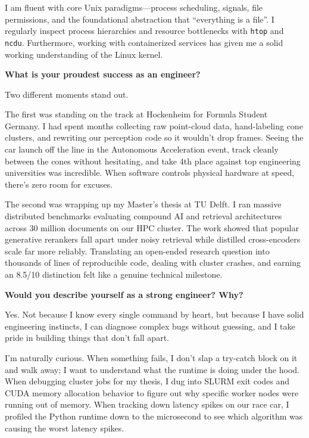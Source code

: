 \documentclass[letterpaper,11pt]{article}
\newcommand{\interviewQuestion}[1]{%
  \vspace{8pt}%
  \textbf{\color{airforceblue}#1}\par%
}
\begin{document}
I am fluent with core Unix paradigms—process scheduling, signals, file permissions, and the foundational abstraction that ``everything is a file''. I regularly inspect process hierarchies and resource bottlenecks with \texttt{htop} and \texttt{ncdu}. Furthermore, working with containerized services has given me a solid working understanding of the Linux kernel.

\interviewQuestion{What is your proudest success as an engineer?}

Two different moments stand out.

The first was standing on the track at Hockenheim for Formula Student Germany. I had spent months collecting raw point-cloud data, hand-labeling cone clusters, and rewriting our perception code so it wouldn't drop frames. Seeing the car launch off the line in the Autonomous Acceleration event, track cleanly between the cones without hesitating, and take 4th place against top engineering universities was incredible. When software controls physical hardware at speed, there's zero room for excuses.

The second was wrapping up my Master's thesis at TU Delft. I ran massive distributed benchmarks evaluating compound AI and retrieval architectures across 30 million documents on our HPC cluster. The work showed that popular generative rerankers fall apart under noisy retrieval while distilled cross-encoders scale far more reliably. Translating an open-ended research question into thousands of lines of reproducible code, dealing with cluster crashes, and earning an 8.5/10 distinction felt like a genuine technical milestone.

\interviewQuestion{Would you describe yourself as a strong engineer? Why?}

Yes. Not because I know every single command by heart, but because I have solid engineering instincts, I can diagnose complex bugs without guessing, and I take pride in building things that don't fall apart.

I'm naturally curious. When something fails, I don't slap a try-catch block on it and walk away; I want to understand what the runtime is doing under the hood. When debugging cluster jobs for my thesis, I dug into SLURM exit codes and CUDA memory allocation behavior to figure out why specific worker nodes were running out of memory. When tracking down latency spikes on our race car, I profiled the Python runtime down to the microsecond to see which algorithm was causing the worst latency spikes.
\end{document}

